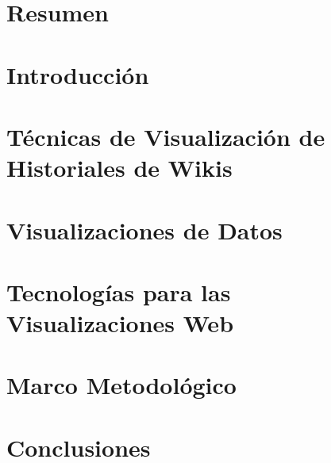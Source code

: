 \documentclass[12pt, twoside]{report}
\begin{document}


\chapter*{Resumen}


\tableofcontents

\chapter*{Introducción}


\chapter{Técnicas de Visualización de Historiales de Wikis}


\chapter{Visualizaciones de Datos}


\chapter{Tecnologías para las Visualizaciones Web}


\chapter{Marco Metodológico}


\chapter*{Conclusiones}


\printbibliography
\end{document}
